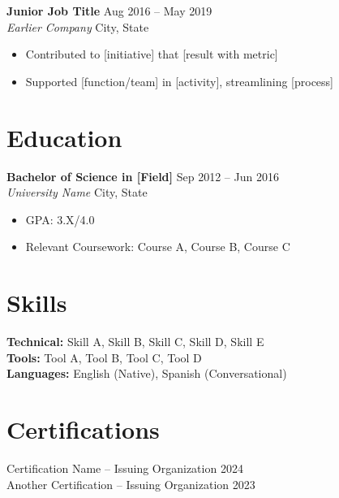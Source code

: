 \documentclass[11pt,a4paper]{article}
\newcommand{\entry}[4]{%
    \noindent\textbf{#1} \hfill #2 \\
    \textit{#3} \hfill #4%
}
\begin{document}
\entry{Junior Job Title}{Aug 2016 -- May 2019}{Earlier Company}{City, State}
\begin{itemize}[leftmargin=1.5em, itemsep=0.2em, topsep=0.3em]
    \item Contributed to [initiative] that [result with metric]
    \item Supported [function/team] in [activity], streamlining [process]
\end{itemize}

\section{Education}

\entry{Bachelor of Science in [Field]}{Sep 2012 -- Jun 2016}{University Name}{City, State}
\begin{itemize}[leftmargin=1.5em, itemsep=0.2em, topsep=0.3em]
    \item GPA: 3.X/4.0
    \item Relevant Coursework: Course A, Course B, Course C
\end{itemize}

\section{Skills}

\textbf{Technical:} Skill A, Skill B, Skill C, Skill D, Skill E \\
\textbf{Tools:} Tool A, Tool B, Tool C, Tool D \\
\textbf{Languages:} English (Native), Spanish (Conversational)

\section{Certifications}

\noindent Certification Name -- Issuing Organization \hfill 2024 \\
Another Certification -- Issuing Organization \hfill 2023
\end{document}
